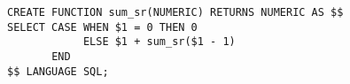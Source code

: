 \begin{verbatim}
CREATE FUNCTION sum_sr(NUMERIC) RETURNS NUMERIC AS $$
SELECT CASE WHEN $1 = 0 THEN 0
            ELSE $1 + sum_sr($1 - 1)
       END
$$ LANGUAGE SQL;
\end{verbatim}